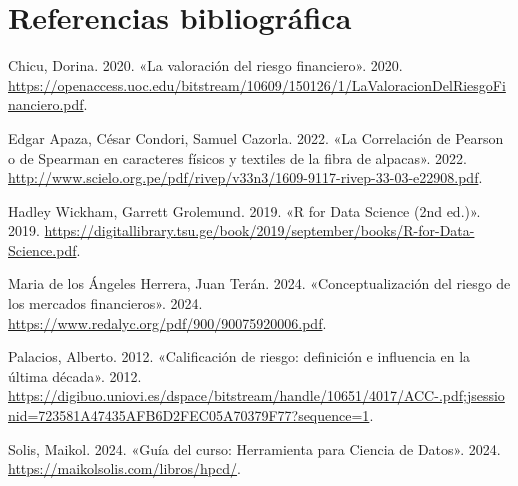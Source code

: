 \documentclass[
  letterpaper,
  DIV=11,
  numbers=noendperiod]{scrreprt}
\newlength{\cslhangindent}
\newenvironment{CSLReferences}[2] %
 {\begin{list}{}{%
  \setlength{\itemindent}{0pt}
  \setlength{\leftmargin}{0pt}
  \setlength{\parsep}{0pt}
  \ifodd #1
   \setlength{\leftmargin}{\cslhangindent}
   \setlength{\itemindent}{-1\cslhangindent}
  \fi
  \setlength{\itemsep}{#2\baselineskip}}}
 {\end{list}}
\begin{document}
\section{Referencias bibliográfica}\label{referencias-bibliogruxe1fica}

\label{refs}
\begin{CSLReferences}{1}{0}
Chicu, Dorina. 2020. {«La valoración del riesgo financiero»}. 2020.
\url{https://openaccess.uoc.edu/bitstream/10609/150126/1/LaValoracionDelRiesgoFinanciero.pdf}.

Edgar Apaza, César Condori, Samuel Cazorla. 2022. {«La Correlación de
Pearson o de Spearman en caracteres físicos y textiles de la fibra de
alpacas»}. 2022.
\url{http://www.scielo.org.pe/pdf/rivep/v33n3/1609-9117-rivep-33-03-e22908.pdf}.

Hadley Wickham, Garrett Grolemund. 2019. {«R for Data Science (2nd
ed.)»}. 2019.
\url{https://digitallibrary.tsu.ge/book/2019/september/books/R-for-Data-Science.pdf}.

Maria de los Ángeles Herrera, Juan Terán. 2024. {«Conceptualización del
riesgo de los mercados financieros»}. 2024.
\url{https://www.redalyc.org/pdf/900/90075920006.pdf}.

Palacios, Alberto. 2012. {«Calificación de riesgo: definición e
influencia en la última década»}. 2012.
\url{https://digibuo.uniovi.es/dspace/bitstream/handle/10651/4017/ACC-.pdf;jsessionid=723581A47435AFB6D2FEC05A70379F77?sequence=1}.

Solis, Maikol. 2024. {«Guía del curso: Herramienta para Ciencia de
Datos»}. 2024. \url{https://maikolsolis.com/libros/hpcd/}.

\end{CSLReferences}
\end{document}

